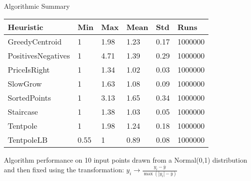 \documentclass[compress,table]{beamer}
\begin{document}
\begin{frame}[t]{Algorithmic Summary}

\begin{table} \centering
\begin{tabular}{|l|lllll|}
\hline
Heuristic & Min & Max & Mean & Std & Runs \\ \hline
GreedyCentroid& 1& 1.98& 1.23& 0.17& 1000000\\ 
PositivesNegatives& 1& 4.71& 1.39& 0.29& 1000000\\ 
PriceIsRight& 1& 1.34& 1.02& 0.03& 1000000\\ 
SlowGrow& 1& 1.63& 1.08& 0.09& 1000000\\ 
SortedPoints& 1& 3.13& 1.65& 0.34& 1000000\\ 
Staircase& 1& 1.38& 1.03& 0.05& 1000000\\ 
Tentpole& 1& 1.98& 1.24& 0.18& 1000000\\ \hline
TentpoleLB& 0.55& 1& 0.89& 0.08& 1000000\\ 
\hline
\end{tabular}
\end{table}

Algorithm performance on 10 input points drawn from a Normal(0,1) distribution and then fixed using the transformation: $y_i \rightarrow \frac{y_i - \bar{y} }{\max(|y_i| - \bar{y}) }$ 

\end{frame}
\end{document}
